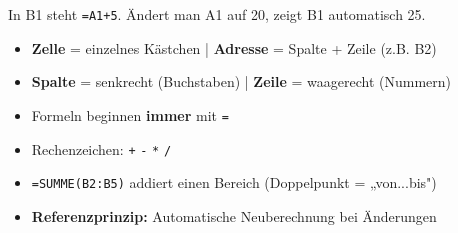 \documentclass[11pt, a4paper]{article}
\begin{document}
{\small In B1 steht \texttt{=A1+5}. Ändert man A1 auf 20, zeigt B1 automatisch 25.}

\vspace{0.5em}


\begin{tcolorbox}[colback=hellgrau, colframe=fachfarbe, boxrule=1pt, arc=0pt, title={\textbf{Zusammenfassung}}, fonttitle=\bfseries\color{white}, coltitle=white, colbacktitle=fachfarbe]
\begin{itemize}[leftmargin=1.5em, itemsep=2pt]
    \item \textbf{Zelle} = einzelnes Kästchen | \textbf{Adresse} = Spalte + Zeile (z.B. B2)
    \item \textbf{Spalte} = senkrecht (Buchstaben) | \textbf{Zeile} = waagerecht (Nummern)
    \item Formeln beginnen \textbf{immer} mit \texttt{=}
    \item Rechenzeichen: \texttt{+} \texttt{-} \texttt{*} \texttt{/}
    \item \texttt{=SUMME(B2:B5)} addiert einen Bereich (Doppelpunkt = „von...bis")
    \item \textbf{Referenzprinzip:} Automatische Neuberechnung bei Änderungen
\end{itemize}
\end{tcolorbox}
\end{document}
